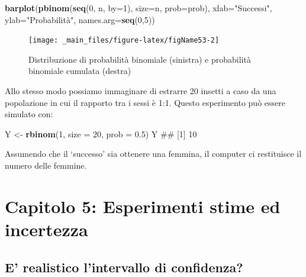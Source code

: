 \documentclass[a4paper,12pt,oneside]{book}
\newenvironment{Shaded}{\begin{snugshade}}{\end{snugshade}}
\newcommand{\KeywordTok}[1]{\textcolor[rgb]{0.13,0.29,0.53}{\textbf{#1}}}
\newcommand{\DataTypeTok}[1]{\textcolor[rgb]{0.13,0.29,0.53}{#1}}
\newcommand{\DecValTok}[1]{\textcolor[rgb]{0.00,0.00,0.81}{#1}}
\newcommand{\FloatTok}[1]{\textcolor[rgb]{0.00,0.00,0.81}{#1}}
\newcommand{\StringTok}[1]{\textcolor[rgb]{0.31,0.60,0.02}{#1}}
\newcommand{\NormalTok}[1]{#1}
\theoremstyle{definition}
\theoremstyle{definition}
\theoremstyle{definition}
\theoremstyle{remark}
\begin{document}
\begin{Shaded}
\begin{Highlighting}[]
\KeywordTok{barplot}\NormalTok{(}\KeywordTok{pbinom}\NormalTok{(}\KeywordTok{seq}\NormalTok{(}\DecValTok{0}\NormalTok{, n, }\DataTypeTok{by=}\DecValTok{1}\NormalTok{), }\DataTypeTok{size=}\NormalTok{n, }\DataTypeTok{prob=}\NormalTok{prob),}
          \DataTypeTok{xlab=}\StringTok{"Successi"}\NormalTok{, }\DataTypeTok{ylab=}\StringTok{"Probabilità"}\NormalTok{,}
          \DataTypeTok{names.arg=}\KeywordTok{seq}\NormalTok{(}\DecValTok{0}\NormalTok{,}\DecValTok{5}\NormalTok{))}
\end{Highlighting}
\end{Shaded}

\begin{figure}

{\centering \texttt{[image: \_main\_files/figure-latex/figName53-2]} 

}

\caption{Distribuzione di probabilità binomiale (sinistra) e probabilità binomiale cumulata (destra)}\label{fig:figName532}
\end{figure}

Allo stesso modo possiamo immaginare di estrarre 20 insetti a caso da
una popolazione in cui il rapporto tra i sessi è 1:1. Questo esperimento
può essere simulato con:

\begin{Shaded}
\begin{Highlighting}[]
\NormalTok{Y <-}\StringTok{ }\KeywordTok{rbinom}\NormalTok{(}\DecValTok{1}\NormalTok{, }\DataTypeTok{size =} \DecValTok{20}\NormalTok{, }\DataTypeTok{prob =} \FloatTok{0.5}\NormalTok{)}
\NormalTok{Y}
\NormalTok{## [1] 10}
\end{Highlighting}
\end{Shaded}

Assumendo che il `successo' sia ottenere una femmina, il computer ci
restituisce il numero delle femmine.

\section{Capitolo 5: Esperimenti stime ed
incertezza}\label{capitolo-5-esperimenti-stime-ed-incertezza}

\subsection{E' realistico l'intervallo di
confidenza?}\label{e-realistico-lintervallo-di-confidenza}
\end{document}
